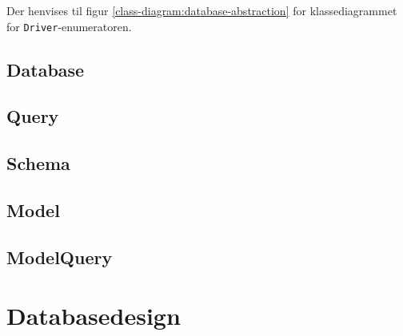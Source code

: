 Der henvises til figur \ref{class-diagram:database-abstraction} for klassediagrammet for \texttt{Driver}-enumeratoren.

\subsection{Database}

\subsection{Query}

\subsection{Schema}

\subsection{Model}

\subsection{ModelQuery}

\section{Databasedesign}